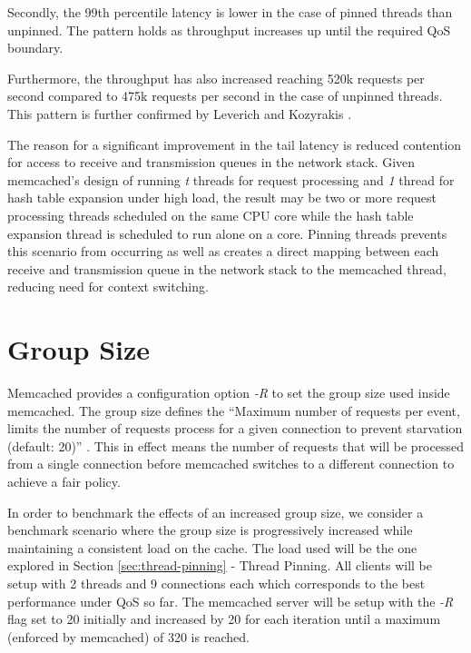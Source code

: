 Secondly, the 99th percentile latency is lower in the case of pinned threads than unpinned. The pattern holds as throughput increases up until the required QoS boundary.

Furthermore, the throughput has also increased reaching 520k requests per second compared to 475k requests per second in the case of unpinned threads. This pattern is further confirmed by  Leverich and Kozyrakis \cite{leverich2014reconciling}.

The reason for a significant improvement in the tail latency is reduced contention for access to receive and transmission queues in the network stack. Given memcached's design of running \textit{t} threads for request processing and \textit{1} thread for hash table expansion under high load, the result may be two or more request processing threads scheduled on the same CPU core while the hash table expansion thread is scheduled to run alone on a core. Pinning threads prevents this scenario from occurring as well as creates a direct mapping between each receive and transmission queue in the network stack to the memcached thread, reducing need for context switching.


\section{Group Size}
Memcached provides a configuration option \textit{-R} to set the group size used inside memcached. The group size defines the ``Maximum number of requests per event, limits the number of requests process for a given connection to prevent starvation (default: 20)'' \cite{interactive2006memcached}. This in effect means the number of requests that will be processed from a single connection before memcached switches to a different connection to achieve a fair policy.

In order to benchmark the effects of an increased group size, we consider a benchmark scenario where the group size is progressively increased while maintaining a consistent load on the cache. The load used will be the one explored in Section \ref{sec:thread-pinning} - Thread Pinning. All clients will be setup with 2 threads and 9 connections each which corresponds to the best performance under QoS so far. The memcached server will be setup with the \textit{-R} flag set to 20 initially and increased by 20 for each iteration until a maximum (enforced by memcached) of 320 is reached.


